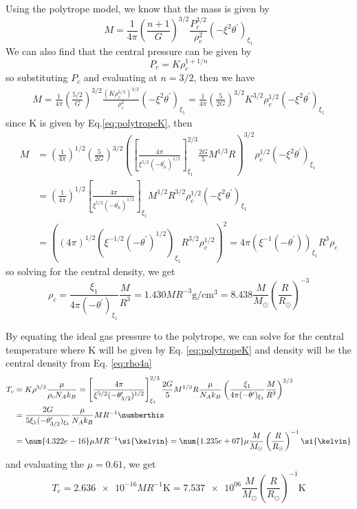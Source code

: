 Using the polytrope model, we know that the mass is given by
\begin{equation*}
    M = \frac{1}{4\pi}\left(\frac{n+1}{G}\right)^{3/2}\frac{P_c^{3/2}}{\rho_c^2}(-\xi^2\theta^\prime)_{\xi_1}
\end{equation*}
We can also find that the central pressure can be given by 
\begin{equation*}
    P_c = K \rho_c^{1+1/n}
\end{equation*}
so substituting $P_c$ and evaluating at $n=3/2$, then we have
\begin{align*}
    M = \frac{1}{4\pi}\left(\frac{5/2}{G}\right)^{3/2}\frac{(K \rho_c^{5/3})^{3/2}}{\rho_c^2}(-\xi^2\theta^\prime)_{\xi_1} = \frac{1}{4\pi}\left(\frac{5}{2G}\right)^{3/2}K^{3/2} \rho_c^{1/2}(-\xi^2\theta^\prime)_{\xi_1}
\end{align*}
since K is given by Eq.\ref{eq:polytropeK}, then 
\begin{align*}
    M &= \left(\frac{1}{4\pi}\right)^{1/2}\left(\frac{5}{2G}\right)^{3/2}\left(\left[\frac{4\pi}{\xi^{5/2}(-\theta^\prime_n)^{1/2}}\right]^{2/3}_{\xi_1}\frac{2G}{5}M^{1/3}R\right)^{3/2} \rho_c^{1/2}(-\xi^2\theta^\prime)_{\xi_1}\\
    &= \left(\frac{1}{4\pi}\right)^{1/2}\left[\frac{4\pi}{\xi^{5/2}(-\theta^\prime_n)^{1/2}}\right]_{\xi_1}M^{1/2}R^{3/2}\rho_c^{1/2}(-\xi^2\theta^\prime)_{\xi_1}\\
    &= ((4\pi)^{1/2}(\xi^{-1/2}(-\theta^\prime)^{1/2})_{\xi_1}R^{3/2}\rho_c^{1/2})^2 
    = 4\pi(\xi^{-1}(-\theta^\prime))_{\xi_1}R^{3}\rho_c 
\end{align*}
so solving for the central density, we get
\begin{equation}
    \rho_c = \frac{\xi_1}{4\pi(-\theta^\prime)_{\xi_1}}\frac{M}{R^3} 
    = 1.430 M R^{-3} \si{\g\per\cm\cubed} 
    = 8.438 \frac{M}{M_\odot} \left(\frac{R}{R_\odot}\right)^{-3}
    \label{eq:rho4a}
\end{equation}

By equating the ideal gas pressure to the polytrope, we can solve for the central temperature where K will be given by Eq. \ref{eq:polytropeK} and density will be the central density from Eq. \ref{eq:rho4a}
\begin{align*}
    T_c &= K \rho^{5/3}\frac{\mu}{\rho_c N_A k_B} 
    = \left[\frac{4\pi}{\xi^{5/2}(-\theta^\prime_{3/2})^{1/2}}\right]^{2/3}_{\xi_1}\frac{2G}{5}M^{1/3}R \frac{\mu}{N_A k_B}\left(\frac{\xi_1}{4\pi(-\theta^\prime)_{\xi_1}}\frac{M}{R^3}\right)^{2/3}\\
    &= \frac{2G}{5\xi_1(-\theta^\prime_{3/2})_{\xi_1}}\frac{\mu}{N_Ak_B}M R^{-1} \numberthis\label{eq:tempCentral4a}\\
    &= \num{4.322e-16} \mu M R^{-1}\si{\kelvin}
    = \num{1.235e+07} \mu \frac{M}{M_\odot}  \left(\frac{R}{R_\odot}\right)^{-1} \si{\kelvin} 
\end{align*}
and evaluating the $\mu=0.61$, we get
\begin{equation*}
    T_c = \num{2.636e-16} M R^{-1}\si{\kelvin} = \num{7.537e+06} \frac{M}{M_\odot}  \left(\frac{R}{R_\odot}\right)^{-1} \si{\kelvin} 
\end{equation*}



